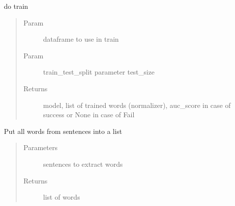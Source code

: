 \documentclass[letterpaper,10pt,english]{sphinxmanual}
\begin{document}
\begin{fulllineitems}
\label{\detokenize{algorithms:algorithms.ird.ird_trainer.train}}
\sphinxAtStartPar
do train
\begin{quote}\begin{description}
\item[{Param}] \leavevmode
\sphinxAtStartPar
dataframe to use in train

\item[{Param}] \leavevmode
\sphinxAtStartPar
train\_test\_split parameter test\_size

\item[{Returns}] \leavevmode
\sphinxAtStartPar
model, list of trained words (normalizer), auc\_score in case of success or None in case of Fail

\end{description}\end{quote}

\end{fulllineitems}


\begin{fulllineitems}
\label{\detokenize{algorithms:algorithms.ird.ird_trainer.words_to_list}}
\sphinxAtStartPar
Put all words from sentences into a list
\begin{quote}\begin{description}
\item[{Parameters}] \leavevmode
\sphinxAtStartPar
{} \textendash{} sentences to extract words

\item[{Returns}] \leavevmode
\sphinxAtStartPar
list of words

\end{description}\end{quote}

\end{fulllineitems}


\sphinxAtStartPar
{}
\end{document}
